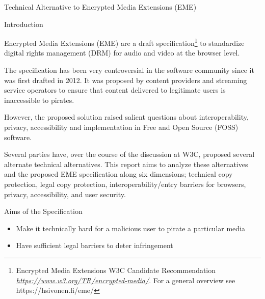 \protect\hypertarget{anchor}{}{}Technical Alternative to Encrypted Media
Extensions (EME)

\protect\hypertarget{anchor-1}{}{}Introduction

Encrypted Media Extensions (EME) are a draft specification\footnote{Encrypted
  Media Extensions W3C Candidate Recommendation
  \href{https://www.w3.org/TR/encrypted-media/}{\emph{https}}\href{https://www.w3.org/TR/encrypted-media/}{\emph{://}}\href{https://www.w3.org/TR/encrypted-media/}{\emph{www}}\href{https://www.w3.org/TR/encrypted-media/}{\emph{.}}\href{https://www.w3.org/TR/encrypted-media/}{\emph{w}}\href{https://www.w3.org/TR/encrypted-media/}{\emph{3.}}\href{https://www.w3.org/TR/encrypted-media/}{\emph{org}}\href{https://www.w3.org/TR/encrypted-media/}{\emph{/}}\href{https://www.w3.org/TR/encrypted-media/}{\emph{TR}}\href{https://www.w3.org/TR/encrypted-media/}{\emph{/}}\href{https://www.w3.org/TR/encrypted-media/}{\emph{encrypted}}\href{https://www.w3.org/TR/encrypted-media/}{\emph{-}}\href{https://www.w3.org/TR/encrypted-media/}{\emph{media}}\href{https://www.w3.org/TR/encrypted-media/}{\emph{/}}.
  For a general overview see https://hsivonen.fi/eme/} to standardize
digital rights management (DRM) for audio and video at the browser
level.

The specification has been very controversial in the software community
since it was first drafted in 2012. It was proposed by content providers
and streaming service operators to ensure that content delivered to
legitimate users is inaccessible to pirates.

However, the proposed solution raised salient questions about
interoperability, privacy, accessibility and implementation in Free and
Open Source (FOSS) software.

Several parties have, over the course of the discussion at W3C, proposed
several alternate technical alternatives. This report aims to analyze
these alternatives and the proposed EME specification along six
dimensions; technical copy protection, legal copy protection,
interoperability/entry barriers for browsers, privacy, accessibility,
and user security.

\protect\hypertarget{anchor-2}{}{}Aims of the Specification

\begin{itemize}
\tightlist
\item
  Make it technically hard for a malicious user to pirate a particular
  media
\item
  Have sufficient legal barriers to deter infringement
\end{itemize}

